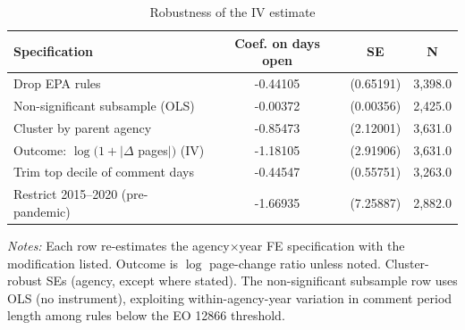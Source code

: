 \begin{table}[t]
\caption{Robustness of the IV estimate}
\label{tab:robust}
\centering
\small
\begin{tabular}{lccc}
\toprule
Specification & Coef. on days open & SE & N \\
\midrule
Drop EPA rules & -0.44105 & (0.65191) & 3,398.0 \\
Non-significant subsample (OLS) & -0.00372 & (0.00356) & 2,425.0 \\
Cluster by parent agency & -0.85473 & (2.12001) & 3,631.0 \\
Outcome: $\log(1+|\Delta$ pages$|)$ (IV) & -1.18105 & (2.91906) & 3,631.0 \\
Trim top decile of comment days & -0.44547 & (0.55751) & 3,263.0 \\
Restrict 2015--2020 (pre-pandemic) & -1.66935 & (7.25887) & 2,882.0 \\
\bottomrule
\end{tabular}
\begin{flushleft}\footnotesize \textit{Notes:} Each row re-estimates the agency$\times$year FE specification with the modification listed. Outcome is $\log$ page-change ratio unless noted. Cluster-robust SEs (agency, except where stated). The non-significant subsample row uses OLS (no instrument), exploiting within-agency-year variation in comment period length among rules below the EO 12866 threshold. \end{flushleft}
\end{table}
